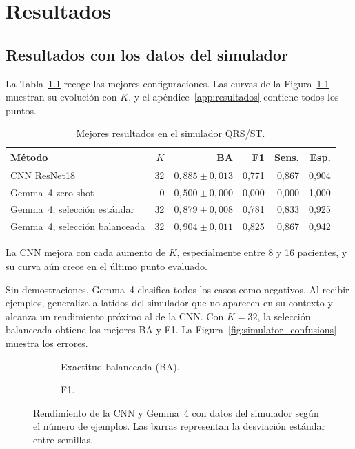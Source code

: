 \chapter{Resultados}
\label{chap:resultados}

\section{Resultados con los datos del simulador}
\label{chap:comparacion_simulador}

La Tabla~\ref{tab:comparacion_simulador} recoge las mejores configuraciones. Las curvas de la Figura~\ref{fig:comparacion_simulador_curvas} muestran su evolución con \(K\), y el apéndice~\ref{app:resultados} contiene todos los puntos.

\begin{table}[H]
  \centering
  \small
  \begin{tabularx}{0.96\textwidth}{Xrrrrr}
    \toprule
    Método & \(K\) & BA & F1 & Sens. & Esp. \\
    \midrule
    CNN ResNet18 & 32 & \(0,885 \pm 0,013\) & 0,771 & 0,867 & 0,904 \\
    Gemma~4 zero-shot & 0 & \(0,500 \pm 0,000\) & 0,000 & 0,000 & 1,000 \\
    Gemma~4, selección estándar & 32 & \(0,879 \pm 0,008\) & 0,781 & 0,833 & 0,925 \\
    Gemma~4, selección balanceada & 32 & \(0,904 \pm 0,011\) & 0,825 & 0,867 & 0,942 \\
    \bottomrule
  \end{tabularx}
  \caption{Mejores resultados en el simulador QRS/ST.}
  \label{tab:comparacion_simulador}
  \resultstablenote
\end{table}

La CNN mejora con cada aumento de \(K\), especialmente entre 8 y 16 pacientes, y su curva aún crece en el último punto evaluado.

Sin demostraciones, Gemma~4 clasifica todos los casos como negativos. Al recibir ejemplos, generaliza a latidos del simulador que no aparecen en su contexto y alcanza un rendimiento próximo al de la CNN. Con \(K=32\), la selección balanceada obtiene los mejores BA y F1. La Figura~\ref{fig:simulator_confusions} muestra los errores.

\begin{figure}[H]
  \centering
  \begin{subfigure}{0.90\textwidth}
    \centering
    \caption{Exactitud balanceada (BA).}
  \end{subfigure}
  \par\medskip
  \begin{subfigure}{0.90\textwidth}
    \centering
    \caption{F1.}
  \end{subfigure}
  \caption{Rendimiento de la CNN y Gemma~4 con datos del simulador según el número de ejemplos. Las barras representan la desviación estándar entre semillas.}
  \label{fig:comparacion_simulador_curvas}
\end{figure}

